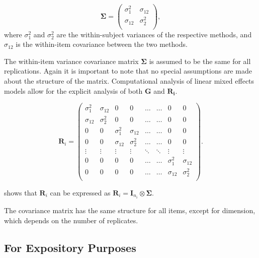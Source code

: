 \documentclass[12pt, a4paper]{report}
\theoremstyle{plain}
\theoremstyle{definition}
\theoremstyle{remark}
\begin{document}
	\[
	\boldsymbol{\Sigma} = \left( \begin{array}{cc}
	\sigma^2_{1} & \sigma_{12} \\
	\sigma_{12} & \sigma^2_{2} \\
	\end{array}\right),
	\]
	where $\sigma^2_{1}$ and $\sigma^2_{2}$ are the within-subject variances of the respective methods, and $\sigma_{12}$ is the within-item covariance between the two methods. 
	
	The within-item variance covariance matrix $\boldsymbol{\Sigma}$ is assumed to be the same for all replications.  Again it is important to note that no special assumptions are made about the structure of the matrix. Computational analysis of linear mixed effects models allow for the explicit analysis of both $\boldsymbol{G}$ and $\boldsymbol{R_i}$.
	
	\[ \boldsymbol{R}_i =\left(
	\begin{array}{cccccccc}
	\sigma^2_1  & \sigma_{12} & 0 & 0 & \ldots & \ldots & 0 & 0 \\
	\sigma_{12} & \sigma^2_2  & 0 & 0  & \ldots & \ldots & 0 & 0\\
	
	0 & 0 &\sigma^2_1  & \sigma_{12} & \ldots & \ldots& 0 &  0 \\
	0 & 0 &\sigma_{12} & \sigma^2_2  & \ldots & \ldots & 0 & 0 \\
	\vdots & \vdots &\vdots & \vdots & \ddots & \ddots& \vdots & \vdots \\
	
	0 & 0 &0 & 0 & \ldots & \ldots&\sigma^2_1  & \sigma_{12} \\
	0 & 0 &0 & 0 & \ldots & \ldots &\sigma_{12} & \sigma^2_2 \\
	\end{array}
	\right). \]
	
	
	\citet{hamlett} shows that $\boldsymbol{R}_{i}$  can be expressed as $\boldsymbol{R}_{i} = \boldsymbol{I}_{n_{i}} \otimes \boldsymbol{\Sigma}$. 
	
	
	
	
	The covariance matrix has the same structure for all items, except for dimension, which depends on the number of replicates. 
	
	
	
	\subsection{For Expository Purposes}
	
\end{document}

